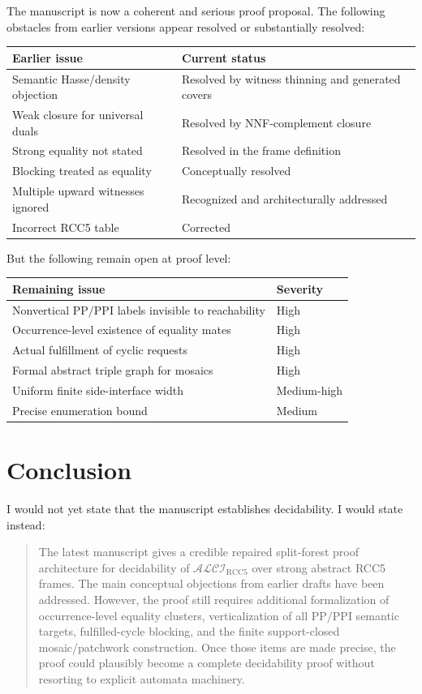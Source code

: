 \documentclass[11pt]{article}
\newcommand{\ALCIRCC}{\mathcal{ALCI}_{\mathrm{RCC5}}}
\newcommand{\PP}{\mathrm{PP}}
\newcommand{\PPI}{\mathrm{PPI}}
\begin{document}
The manuscript is now a coherent and serious proof proposal.  The following obstacles from earlier versions appear resolved or substantially resolved:
\begin{center}
\begin{tabular}{@{}ll@{}}
\toprule
Earlier issue & Current status \\
\midrule
Semantic Hasse/density objection & Resolved by witness thinning and generated covers \\
Weak closure for universal duals & Resolved by NNF-complement closure \\
Strong equality not stated & Resolved in the frame definition \\
Blocking treated as equality & Conceptually resolved \\
Multiple upward witnesses ignored & Recognized and architecturally addressed \\
Incorrect RCC5 table & Corrected \\
\bottomrule
\end{tabular}
\end{center}

But the following remain open at proof level:
\begin{center}
\begin{tabular}{@{}ll@{}}
\toprule
Remaining issue & Severity \\
\midrule
Nonvertical \(\PP/\PPI\) labels invisible to reachability & High \\
Occurrence-level existence of equality mates & High \\
Actual fulfillment of cyclic requests & High \\
Formal abstract triple graph for mosaics & High \\
Uniform finite side-interface width & Medium-high \\
Precise enumeration bound & Medium \\
\bottomrule
\end{tabular}
\end{center}

\section{Conclusion}

I would not yet state that the manuscript establishes decidability.  I would state instead:
\begin{quote}
The latest manuscript gives a credible repaired split-forest proof architecture for decidability of \(\ALCIRCC\) over strong abstract RCC5 frames.  The main conceptual objections from earlier drafts have been addressed.  However, the proof still requires additional formalization of occurrence-level equality clusters, verticalization of all \(\PP/\PPI\) semantic targets, fulfilled-cycle blocking, and the finite support-closed mosaic/patchwork construction.  Once those items are made precise, the proof could plausibly become a complete decidability proof without resorting to explicit automata machinery.
\end{quote}
\end{document}
